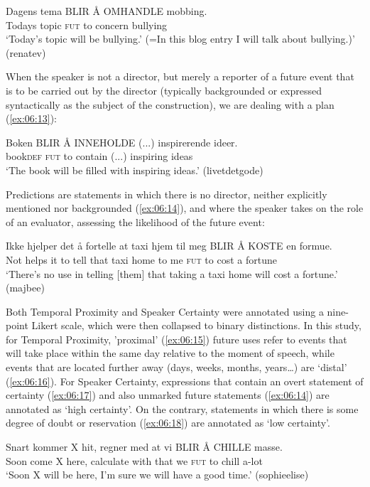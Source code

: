 \documentclass[output=paper,colorlinks,citecolor=brown]{langscibook}
\begin{document}
\ea\label{ex:06:12}
\gll Dagens tema BLIR Å OMHANDLE mobbing. \\
     Todays topic \textsc{fut} to concern bullying\\
\glt ‘Today's topic will be bullying.’ (=In this blog entry I will talk about bullying.)’ (renatev)
\z

When the speaker is not a director, but merely a reporter of a future event that is to be carried out by the director (typically backgrounded or expressed syntactically as the subject of the construction), we are dealing with a plan (\ref{ex:06:13}):

\ea\label{ex:06:13}
\gll Boken BLIR Å INNEHOLDE (...) inspirerende ideer. \\
     book\textsc{def} \textsc{fut} to contain (...) inspiring ideas\\
\glt ‘The book will be filled with inspiring ideas.’ (livetdetgode)
\z

Predictions are statements in which there is no director, neither explicitly mentioned nor backgrounded (\ref{ex:06:14}), and where the speaker takes on the role of an evaluator, assessing the likelihood of the future event:

\ea\label{ex:06:14}
\gll Ikke hjelper det å fortelle at taxi hjem til meg BLIR Å KOSTE en formue. \\
     Not helps it to tell that taxi home to me \textsc{fut} to cost a fortune\\
\glt ‘There’s no use in telling [them] that taking a taxi home will cost a fortune.’ (majbee)
\z

Both Temporal Proximity and Speaker Certainty were annotated using a nine-point Likert scale, which were then collapsed to binary distinctions. In this study, for Temporal Proximity, 'proximal’ (\ref{ex:06:15}) future uses refer to events that will take place within the same day relative to the moment of speech, while events that are located further away (days, weeks, months, years…) are ‘distal’ (\ref{ex:06:16}). For Speaker Certainty, expressions that contain an overt statement of certainty (\ref{ex:06:17}) and also unmarked future statements (\ref{ex:06:14}) are annotated as ‘high certainty’. On the contrary, statements in which there is some degree of doubt or reservation (\ref{ex:06:18}) are annotated as ‘low certainty’.

\ea\label{ex:06:15}
\gll Snart kommer X hit, regner med at vi BLIR Å CHILLE masse. \\
     Soon come X here, calculate with that we \textsc{fut} to chill a-lot\\
\glt ‘Soon X will be here, I'm sure we will have a good time.’ (sophieelise)
\z
\end{document}
